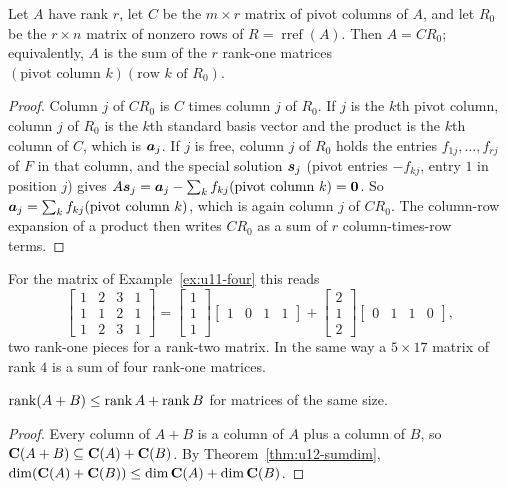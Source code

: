 \begin{theorem}\label{thm:u12-CR}
Let $A$ have rank $r$, let $C$ be the $m\times r$ matrix of pivot columns of $A$, and let $R_0$ be
the $r\times n$ matrix of nonzero rows of $R=\operatorname{rref}(A)$. Then $A=CR_0$; equivalently, $A$
is the sum of the $r$ rank-one matrices $(\text{pivot column }k)(\text{row }k\text{ of }R_0)$.
\end{theorem}
\begin{proof}
Column $j$ of $CR_0$ is $C$ times column $j$ of $R_0$. If $j$ is the $k$th pivot column, column $j$
of $R_0$ is the $k$th standard basis vector and the product is the $k$th column of $C$, which is
$\boldsymbol{a}_j$. If $j$ is free, column $j$ of $R_0$ holds the entries $f_{1j},\dots,f_{rj}$ of $F$ in
that column, and the special solution $\boldsymbol{s}_j$ (pivot entries $-f_{kj}$, entry $1$ in position $j$)
gives $A\boldsymbol{s}_j=\boldsymbol{a}_j-\sum_kf_{kj}(\text{pivot column }k)=\boldsymbol{0}$. So
$\boldsymbol{a}_j=\sum_kf_{kj}(\text{pivot column }k)$, which is again column $j$ of $CR_0$. The column-row
expansion of a product then writes $CR_0$ as a sum of $r$ column-times-row terms.
\end{proof}

For the matrix of Example~\ref{ex:u11-four} this reads
\[
\begin{bmatrix}1&2&3&1\\1&1&2&1\\1&2&3&1\end{bmatrix}
=\begin{bmatrix}1\\1\\1\end{bmatrix}\begin{bmatrix}1&0&1&1\end{bmatrix}
+\begin{bmatrix}2\\1\\2\end{bmatrix}\begin{bmatrix}0&1&1&0\end{bmatrix},
\]
two rank-one pieces for a rank-two matrix. In the same way a $5\times17$ matrix of rank $4$ is a sum
of four rank-one matrices.

\begin{proposition}\label{prop:u12-subadd}
$\operatorname{rank}(A+B)\le\operatorname{rank} A+\operatorname{rank} B$ for matrices of the same size.
\end{proposition}
\begin{proof}
Every column of $A+B$ is a column of $A$ plus a column of $B$, so $\mathbf{C}(A+B)\subseteq\mathbf{C}(A)+\mathbf{C}(B)$.
By Theorem~\ref{thm:u12-sumdim}, $\dim(\mathbf{C}(A)+\mathbf{C}(B))\le\dim\mathbf{C}(A)+\dim\mathbf{C}(B)$.
\end{proof}

